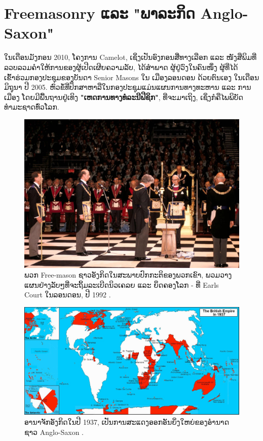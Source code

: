 \documentclass[10pt,twocolumn,letterpaper]{article}
\begin{document}
\section{Freemasonry ແລະ "ພາລະກິດ Anglo-Saxon"}

ໃນເດືອນມັງກອນ 2010, ໂຄງການ Camelot, ເຊິ່ງເປັນອົງກອນສື່ທາງເລືອກ ແລະ ໜັງສືພິມທີ່ລວບລວມຄຳໃຫ້ການຂອງຜູ້ເປີດເຜີຍຄວາມລັບ, ໄດ້ສໍາພາດ \cite{4,6} ຜູ້ຢູ່ວົງໃນຄົນໜຶ່ງ ຜູ້ທີ່ໄດ້ເຂົ້າຮ່ວມກອງປະຊຸມຂອງບັນດາ Senior Masons ໃນ ເມືອງລອນດອນ ດ້ວຍຕົນເອງ ໃນເດືອນມິຖຸນາ ປີ 2005.
ຫົວຂໍ້ທີ່ປຶກສາຫາລືໃນກອງປະຊຸມແມ່ນແຜນການທາງທະຫານ ແລະ ການເມືອງ ໂດຍມີພື້ນຖານຢູ່ເທິງ \textbf{"ເຫດການທາງທໍລະນີຟີຊິກ"}, ທີ່ຈະມາເຖິງ, ເຊິ່ງກໍຄືໄພພິບັດທໍາມະຊາດທົ່ວໂລກ. \cite{96}

\begin{figure}[b]
\begin{center}
   \includegraphics[width=1\linewidth]{freemason.jpg}
\end{center}
   \caption{ພວກ Free-mason ຊາວອັງກິດໃນສະພາບປົກກະຕິຂອງພວກເຂົາ, ພວມວາງແຜນຢ່າງລັບໆທີ່ຈະຖິ້ມລະເບີດນິວເຄລຍ ແລະ ຍຶດຄອງໂລກ - ທີ່ Earls Court ໃນລອນດອນ, ປີ 1992 \cite{5}.}
\label{fig:1}
\label{fig:onecol}
\end{figure}

\begin{figure}[t]
\begin{center}
\includegraphics[width=1\textwidth]{british.jpg}
\end{center}
   \caption{ອານາຈັກອັງກິດໃນປີ 1937, ເປັນການສະແດງອອກອັນຍິ່ງໃຫຍ່ຂອງອຳນາດຊາວ Anglo-Saxon \cite{14}.}
   \label{fig:2}
\end{figure}
\end{document}
